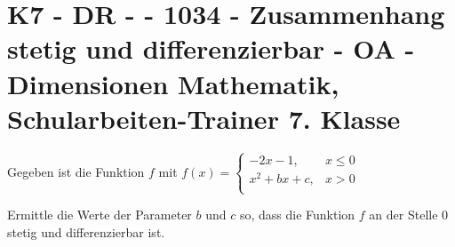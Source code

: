 \section{K7 - DR -  - 1034 - Zusammenhang stetig und differenzierbar - OA - Dimensionen Mathematik, Schularbeiten-Trainer 7. Klasse}

\begin{beispiel}[K7 - DR]{1} %
Gegeben ist die Funktion $f$ mit $f(x)=\begin{cases}-2x-1,&x\leq 0\\
x^2+bx+c,&x>0\\
\end{cases}$

Ermittle die Werte der Parameter $b$ und $c$ so, dass die Funktion $f$ an der Stelle 0 stetig und differenzierbar ist.\leer

				\end{beispiel}